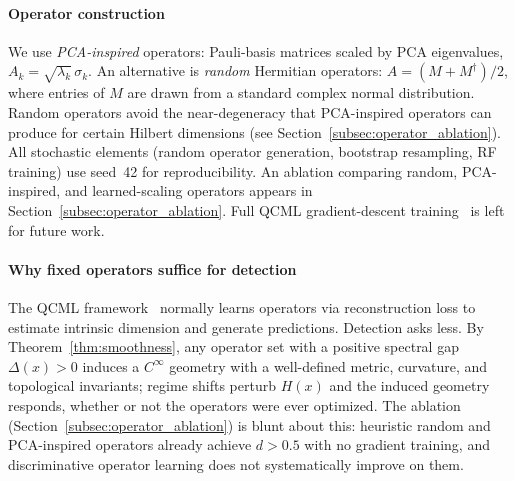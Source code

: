 \documentclass[3p]{elsarticle}
\begin{document}
\paragraph{Operator construction}
We use \emph{PCA-inspired} operators: Pauli-basis matrices scaled by
PCA eigenvalues, $A_k = \sqrt{\lambda_k}\,\sigma_k$.  An alternative
is \emph{random} Hermitian operators: $A = (M + M^\dagger)/2$, where
entries of $M$ are drawn from a standard complex normal distribution.
Random operators avoid the near-degeneracy that PCA-inspired operators
can produce for certain Hilbert dimensions (see
Section~\ref{subsec:operator_ablation}).  All stochastic elements
(random operator generation, bootstrap resampling, RF training) use
seed~42 for reproducibility.  An ablation comparing random,
PCA-inspired, and learned-scaling operators appears in
Section~\ref{subsec:operator_ablation}.  Full QCML gradient-descent
training~\cite{musaelian2024,samson2024} is left for future work.

\paragraph{Why fixed operators suffice for detection}
The QCML framework~\cite{candelori2025} normally learns operators via
reconstruction loss to estimate intrinsic dimension and generate
predictions.  Detection asks less.  By
Theorem~\ref{thm:smoothness}, any operator set with a positive
spectral gap $\Delta(x) > 0$ induces a $C^\infty$ geometry with a
well-defined metric, curvature, and topological invariants; regime
shifts perturb $H(x)$ and the induced geometry responds, whether or
not the operators were ever optimized.  The ablation
(Section~\ref{subsec:operator_ablation}) is blunt about this:
heuristic random and PCA-inspired operators already achieve $d > 0.5$
with no gradient training, and discriminative operator learning
does not systematically improve on them.
\end{document}
